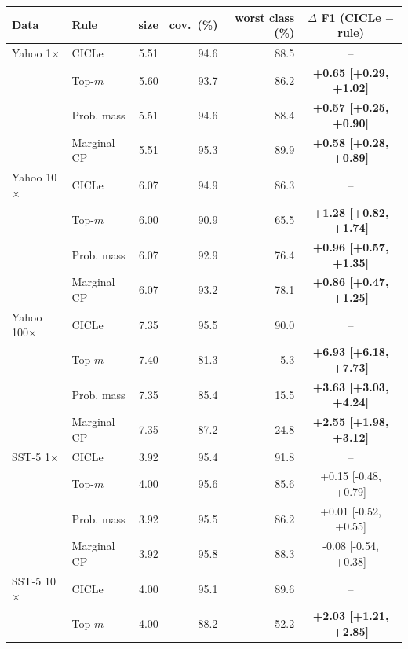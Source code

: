 \begin{tabular}{llrrrc}
\toprule
Data & Rule & size & cov.\ (\%) & worst class (\%) & $\Delta$ F1 (CICLe $-$ rule) \\
\midrule
Yahoo 1$\times$ & CICLe & 5.51 & 94.6 & 88.5 & -- \\
 & Top-$m$ & 5.60 & 93.7 & 86.2 & \textbf{+0.65 [+0.29, +1.02]} \\
 & Prob. mass & 5.51 & 94.6 & 88.4 & \textbf{+0.57 [+0.25, +0.90]} \\
 & Marginal CP & 5.51 & 95.3 & 89.9 & \textbf{+0.58 [+0.28, +0.89]} \\
\addlinespace
Yahoo 10$\times$ & CICLe & 6.07 & 94.9 & 86.3 & -- \\
 & Top-$m$ & 6.00 & 90.9 & 65.5 & \textbf{+1.28 [+0.82, +1.74]} \\
 & Prob. mass & 6.07 & 92.9 & 76.4 & \textbf{+0.96 [+0.57, +1.35]} \\
 & Marginal CP & 6.07 & 93.2 & 78.1 & \textbf{+0.86 [+0.47, +1.25]} \\
\addlinespace
Yahoo 100$\times$ & CICLe & 7.35 & 95.5 & 90.0 & -- \\
 & Top-$m$ & 7.40 & 81.3 & 5.3 & \textbf{+6.93 [+6.18, +7.73]} \\
 & Prob. mass & 7.35 & 85.4 & 15.5 & \textbf{+3.63 [+3.03, +4.24]} \\
 & Marginal CP & 7.35 & 87.2 & 24.8 & \textbf{+2.55 [+1.98, +3.12]} \\
\addlinespace
SST-5 1$\times$ & CICLe & 3.92 & 95.4 & 91.8 & -- \\
 & Top-$m$ & 4.00 & 95.6 & 85.6 & +0.15 [-0.48, +0.79] \\
 & Prob. mass & 3.92 & 95.5 & 86.2 & +0.01 [-0.52, +0.55] \\
 & Marginal CP & 3.92 & 95.8 & 88.3 & -0.08 [-0.54, +0.38] \\
\addlinespace
SST-5 10$\times$ & CICLe & 4.00 & 95.1 & 89.6 & -- \\
 & Top-$m$ & 4.00 & 88.2 & 52.2 & \textbf{+2.03 [+1.21, +2.85]} \\

\end{tabular}
